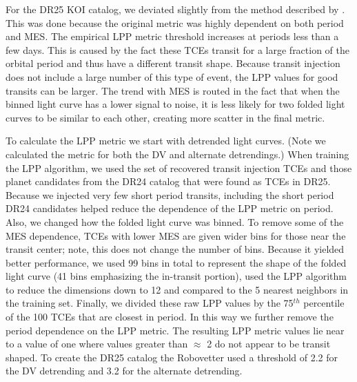 For the DR25 KOI catalog, we deviated slightly from the method described by \citet{Thompson2015b}.  This was done because the original metric was highly dependent on both period and MES. The empirical LPP metric threshold increases at periods less than a few days. This is caused by the fact these TCEs transit for a large fraction of the orbital period and thus have a different transit shape. Because transit injection does not include a large number of this type of event, the LPP values for good transits can be larger. The trend with MES is routed in the fact that when the binned light curve has a lower signal to noise, it is less likely for two folded light curves to be similar to each other, creating more scatter in the final metric. 

To calculate the LPP metric we start with detrended \kepler{} light curves. (Note we calculated the metric for both the DV and alternate detrendings.)  When training the LPP algorithm, we used the set of recovered transit injection TCEs and those planet candidates from the DR24 catalog \citep{Coughlin2016cat} that were found as TCEs in DR25.  Because we injected very few short period transits, including the short period DR24 candidates helped reduce the dependence of the LPP metric on period.  Also, we changed how the folded light curve was binned. To remove some of the MES dependence, TCEs with lower MES are given wider bins for those near the transit center; note, this does not change the number of bins. Because it yielded better performance, we used 99 bins in total to represent the shape of the folded light curve (41 bins emphasizing the in-transit portion), used the LPP algorithm to reduce the dimensions down to 12 and compared to the 5 nearest neighbors in the training set.  Finally, we divided these raw LPP values by the 75$^{th}$ percentile of the 100 TCEs that are closest in period. 
In this way we further remove the period dependence on the LPP metric.  The resulting LPP metric values lie near to a value of one where values greater than $\approx$ 2 do not appear to be transit shaped.  To create the DR25 catalog the Robovetter used a threshold of 2.2 for the DV detrending and 3.2 for the alternate detrending.

